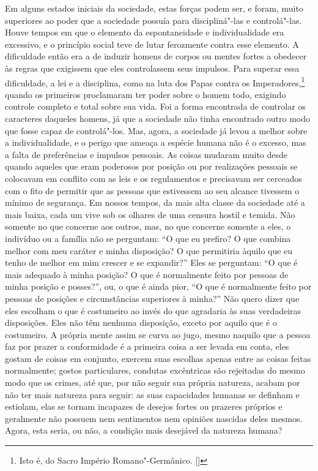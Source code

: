 Em alguns estados iniciais da sociedade, estas forças podem ser, e foram,
muito superiores ao poder que a sociedade possuía para discipliná"-las
e controlá"-las. Houve tempos em que o elemento da espontaneidade e
individualidade era excessivo, e o princípio social teve de lutar
ferozmente contra esse elemento. A dificuldade então era a de induzir
homens de corpos ou mentes fortes a obedecer às regras que exigissem
que eles controlassem seus impulsos. Para superar essa dificuldade, a
lei e a disciplina, como na luta dos Papas contra os Imperadores,\footnote{ Isto 
é, do Sacro Império Romano"-Germânico. []} quando
os primeiros proclamaram ter poder sobre o homem todo, exigindo
controle completo e total sobre sua vida. Foi a forma encontrada de
controlar os caracteres daqueles homens, já que a sociedade não
tinha encontrado outro modo que fosse capaz de controlá"-los. Mas,
agora, a sociedade já levou a melhor sobre a individualidade, e o perigo
que ameaça a espécie humana não é o excesso, mas a falta de
preferências e impulsos pessoais. As coisas mudaram muito desde quando
aqueles que eram poderosos por posição ou por realizações pessoais se
colocavam em conflito com as leis e os regulamentos e precisavam ser
cerceados com o fito de permitir que as pessoas que estivessem ao seu
alcance tivessem o mínimo de segurança. Em nossos tempos, da mais alta classe da sociedade até a
mais baixa, cada um vive sob os olhares de uma censura hostil e temida.
Não somente no que concerne aos outros, mas, no que concerne somente a
eles, o indivíduo ou a família não se perguntam: “O que eu prefiro? O
que combina melhor com meu caráter e minha disposição? O que permitiria
àquilo que eu tenho de melhor em mim crescer e se expandir?” Eles
se perguntam: “O que é mais adequado à minha posição? O que é
normalmente feito por pessoas de minha posição e posses?”, ou, o que é
ainda pior, “O que é normalmente feito por pessoas de posições e
circunstâncias superiores à minha?” Não quero dizer que eles escolham o
que é costumeiro ao invés do que agradaria às suas \mbox{verdadeiras}
disposições. Eles não têm nenhuma disposição, exceto por aquilo que é
o costumeiro. A própria mente assim se curva ao jugo, mesmo naquilo que
a pessoa faz por prazer a conformidade é a primeira coisa a ser levada
em conta, eles gostam de coisas em conjunto, exercem suas escolhas
apenas entre as coisas feitas normalmente; gostos particulares,
condutas excêntricas são rejeitadas do mesmo modo que os crimes, até
que, por não seguir sua própria natureza, acabam por não ter mais
natureza para seguir: as suas capacidades humanas se definham e
estiolam, elas se tornam incapazes de desejos fortes ou prazeres
próprios e geralmente não possuem nem sentimentos nem opiniões nascidas
deles mesmos. Agora, esta seria, ou não, a condição mais desejável da
natureza humana? 

